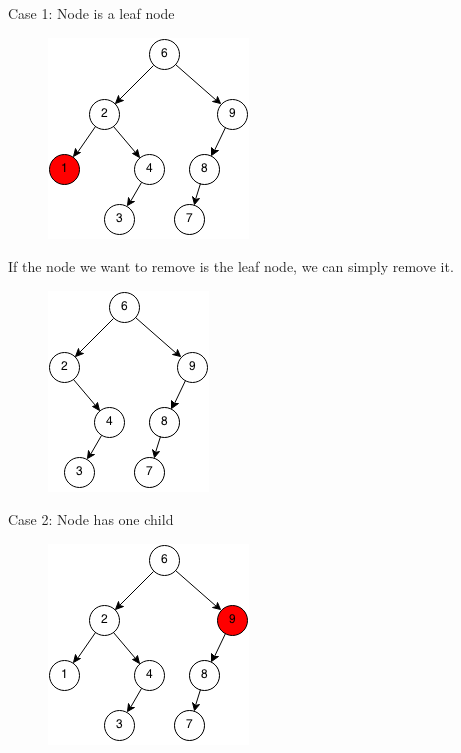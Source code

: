 \documentclass[11pt,oneside]{book}
\makeatletter
\def\maxwidth#1{\ifdim\Gin@nat@width>#1 #1\else\Gin@nat@width\fi}
\makeatother
\begin{document}
Case 1: Node is a leaf node

\vspace{5px}\begin{figure}[H]\centering
        \includegraphics[width=0.66\maxwidth{\textwidth}]{bst-rem-case11.png}
        \end{figure}

If the node we want to remove is the leaf node, we can simply remove it.

\vspace{5px}\begin{figure}[H]\centering
        \includegraphics[width=0.66\maxwidth{\textwidth}]{bst-rem-case12.png}
        \end{figure}

Case 2: Node has one child

\vspace{5px}\begin{figure}[H]\centering
        \includegraphics[width=0.66\maxwidth{\textwidth}]{bst-rem-case21.png}
        \end{figure}
\end{document}
